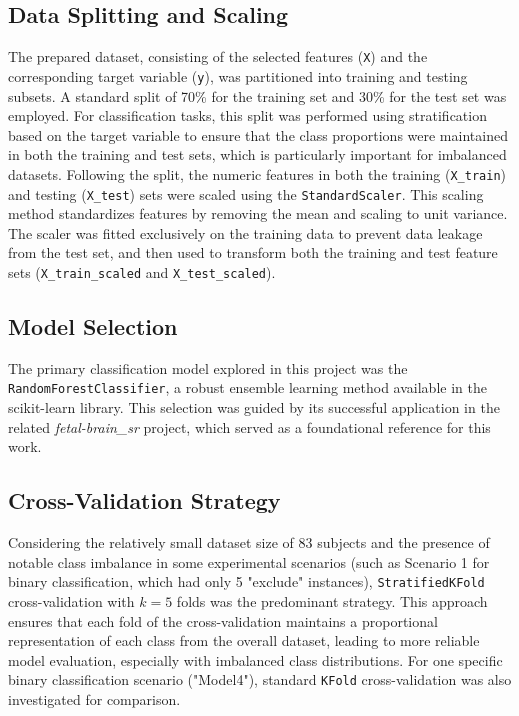 \subsection{Data Splitting and Scaling}
\label{ssec:data_splitting_scaling_methods} %
The prepared dataset, consisting of the selected features (\texttt{X}) and the corresponding target variable (\texttt{y}), was partitioned into training and testing subsets. A standard split of 70\% for the training set and 30\% for the test set was employed. For classification tasks, this split was performed using stratification based on the target variable to ensure that the class proportions were maintained in both the training and test sets, which is particularly important for imbalanced datasets. Following the split, the numeric features in both the training (\texttt{X\_train}) and testing (\texttt{X\_test}) sets were scaled using the \texttt{StandardScaler}. This scaling method standardizes features by removing the mean and scaling to unit variance. The scaler was fitted exclusively on the training data to prevent data leakage from the test set, and then used to transform both the training and test feature sets (\texttt{X\_train\_scaled} and \texttt{X\_test\_scaled}).

\subsection{Model Selection}
\label{ssec:model_selection_methods} %
The primary classification model explored in this project was the \texttt{RandomForestClassifier}, a robust ensemble learning method available in the scikit-learn library. This selection was guided by its successful application in the related \textit{fetal-brain\_sr} project, which served as a foundational reference for this work.

\subsection{Cross-Validation Strategy}
\label{ssec:cv_strategy_methods} %
Considering the relatively small dataset size of 83 subjects and the presence of notable class imbalance in some experimental scenarios (such as Scenario 1 for binary classification, which had only 5 "exclude" instances), \texttt{StratifiedKFold} cross-validation with $k=5$ folds was the predominant strategy. This approach ensures that each fold of the cross-validation maintains a proportional representation of each class from the overall dataset, leading to more reliable model evaluation, especially with imbalanced class distributions. For one specific binary classification scenario ("Model4"), standard \texttt{KFold} cross-validation was also investigated for comparison.

